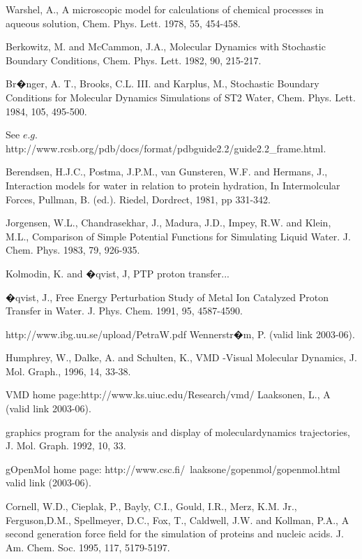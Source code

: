 \documentclass[a4paper,10pt]{article}
\begin{document}
\begin{thebibliography}{2}
Warshel, A., A microscopic
model for calculations of chemical processes in aqueous solution,
Chem. Phys. Lett. 1978, 55, 454-458.

Berkowitz, M. and McCammon, J.A., Molecular Dynamics with Stochastic Boundary Conditions,
Chem. Phys. Lett. 1982, 90, 215-217.

Br�nger, A. T., Brooks, C.L. III. and Karplus, M., Stochastic Boundary Conditions for
Molecular Dynamics Simulations of ST2 Water, Chem. Phys. Lett.
1984, 105, 495-500.

See $e.g.$ http://www.rcsb.org/pdb/docs/format/pdbguide2.2/guide2.2\_frame.html.

Berendsen, H.J.C., Postma, J.P.M., van Gunsteren, W.F. and Hermans, J., Interaction
models for water in relation to protein hydration, In
Intermolcular Forces, Pullman, B. (ed.). Riedel, Dordrect, 1981,
pp 331-342.

Jorgensen, W.L., Chandrasekhar, J., Madura, J.D., Impey, R.W. and Klein, M.L., Comparison
of Simple Potential Functions for Simulating Liquid Water. J.
Chem. Phys. 1983, 79, 926-935.

Kolmodin, K. and �qvist, J, PTP proton transfer...

�qvist, J., Free Energy Perturbation Study of Metal Ion Catalyzed Proton Transfer in Water. J. Phys. Chem. 1991, 95,
4587-4590.

 http://www.ibg.uu.se/upload/PetraW.pdf Wennerstr�m, P. (valid link
2003-06).

 Humphrey, W., Dalke, A. and Schulten, K., VMD -Visual Molecular Dynamics, J. Mol. Graph., 1996, 14,
33-38.

 VMD home page:http://www.ks.uiuc.edu/Research/vmd/ Laaksonen, L., A (valid link
2003-06).

 graphics program for the analysis and display of moleculardynamics trajectories, J. Mol. Graph. 1992, 10, 33.

 gOpenMol home page: http://www.csc.fi/~laaksone/gopenmol/gopenmol.html valid link (2003-06).

 Cornell, W.D., Cieplak, P., Bayly, C.I., Gould, I.R., Merz, K.M. Jr., Ferguson,D.M., Spellmeyer, D.C., Fox, T., Caldwell, J.W. and Kollman, P.A., A second generation force field for the simulation of proteins and nucleic acids. J. Am. Chem. Soc. 1995, 117,
5179-5197.


\end{thebibliography}
\end{document}
